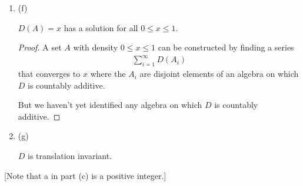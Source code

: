 \begin{enumerate}
\begin{enumerate}[label=(\alph*)]
\begin{proof}
      Fix $n \in \{1, 2, \ldots\}$ and let $p_1, \ldots, p_r$ be the distinct prime factors of $n$.
      Then
      \begin{align*}
        \varphi(n)
        &= n P_n\Big(\big(\bigcup_{i=1}^r M_p\big)^c\Big) \\
        &= n \Big(1 - P_n\big(\bigcup_{i=1}^r M_p\big)\Big) \\
        &= n \Big(1 - \Big(\frac{1}{p_1} + \frac{1}{p_2} + \frac{1}{p_3} + \ldots - \frac{1}{p_1p_2} - \frac{1}{p_1p_3} - \ldots + (-1)^r\frac{1}{p_1p_2p_3\cdots p_r}\Big)\Big) \\
        &= n \prod_{i=1}^r(1 - p_i).
      \end{align*}
    \end{proof}

  \item (f)
    \begin{claim*}
	    $D(A) = x$ has a solution for all $0 \leq x \leq 1$.
    \end{claim*}
    \begin{proof}
      A set $A$ with density $ 0 \leq x \leq 1$ can be constructed by finding a series
      \begin{align*}
        \sum_{i=1}^\infty D(A_i)
      \end{align*}
      that converges to $x$ where the $A_i$ are disjoint elements of an algebra on which $D$ is countably
      additive.

      But we haven't yet identified any algebra on which $D$ is countably additive.
    \end{proof}

  \item (g)
    \begin{claim*}
      $D$ is translation invariant.
    \end{claim*}
  \end{enumerate}
  [Note that a in part (c) is a positive integer.]

\end{enumerate}